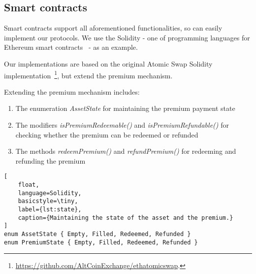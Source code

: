\subsection{Smart contracts}

Smart contracts support all aforementioned functionalities, so can easily implement our protocols.
We use the Solidity - one of programming languages for Ethereum smart contracts~\cite{wood2014ethereum} - as an example.

Our implementations are based on the original Atomic Swap Solidity implementation~\footnote{\url{https://github.com/AltCoinExchange/ethatomicswap}.},
but extend the premium mechanism.

Extending the premium mechanism includes:

\begin{enumerate}
    \item The enumeration \textit{AssetState} for maintaining the premium payment state
    \item The modifiers \textit{isPremiumRedeemable()} and \textit{isPremiumRefundable()} for checking whether the premium can be redeemed or refunded
    \item The methods \textit{redeemPremium()} and \textit{refundPremium()} for redeeming and refunding the premium
\end{enumerate}

\begin{lstlisting}[
    float,
    language=Solidity, 
    basicstyle=\tiny,
    label={lst:state},
    caption={Maintaining the state of the asset and the premium.}
]
enum AssetState { Empty, Filled, Redeemed, Refunded }
enum PremiumState { Empty, Filled, Redeemed, Refunded }
\end{lstlisting}

